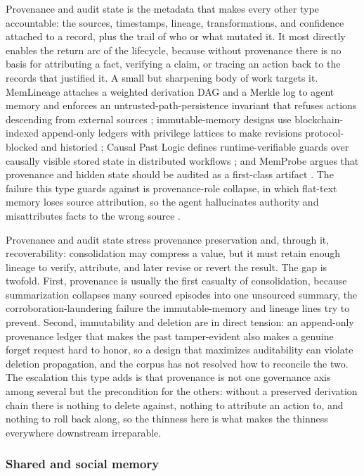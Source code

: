 Provenance and audit state is the metadata that makes every other type accountable: the sources, timestamps, lineage, transformations, and confidence attached to a record, plus the trail of who or what mutated it. It most directly enables the return arc of the lifecycle, because without provenance there is no basis for attributing a fact, verifying a claim, or tracing an action back to the records that justified it. A small but sharpening body of work targets it. MemLineage attaches a weighted derivation DAG and a Merkle log to agent memory and enforces an untrusted-path-persistence invariant that refuses actions descending from external sources \citep{ouyang2026memlineage}; immutable-memory designs use blockchain-indexed append-only ledgers with privilege lattices to make revisions protocol-blocked and historied \citep{wright2025immutablemem}; Causal Past Logic defines runtime-verifiable guards over causally visible stored state in distributed workflows \citep{bollig2026causalpast}; and MemProbe argues that provenance and hidden state should be audited as a first-class artifact \citep{ma2026memprobe}. The failure this type guards against is provenance-role collapse, in which flat-text memory loses source attribution, so the agent hallucinates authority and misattributes facts to the wrong source \citep{jin2026provenancerolecollapse}.

Provenance and audit state stress provenance preservation and, through it, recoverability: consolidation may compress a value, but it must retain enough lineage to verify, attribute, and later revise or revert the result. The gap is twofold. First, provenance is usually the first casualty of consolidation, because summarization collapses many sourced episodes into one unsourced summary, the corroboration-laundering failure the immutable-memory and lineage lines try to prevent. Second, immutability and deletion are in direct tension: an append-only provenance ledger that makes the past tamper-evident also makes a genuine forget request hard to honor, so a design that maximizes auditability can violate deletion propagation, and the corpus has not resolved how to reconcile the two. The escalation this type adds is that provenance is not one governance axis among several but the precondition for the others: without a preserved derivation chain there is nothing to delete against, nothing to attribute an action to, and nothing to roll back along, so the thinness here is what makes the thinness everywhere downstream irreparable.

\subsubsection{Shared and social memory}

